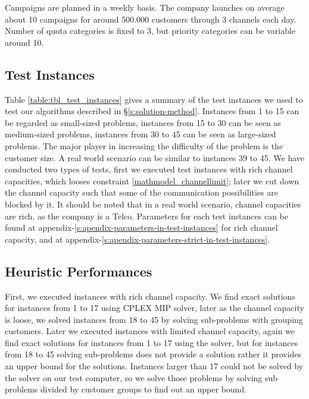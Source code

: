 \documentclass[11pt]{article}
\begin{document}
Campaigns are planned in a weekly basis. The company launches on average about 10 campaigns for around 500.000 customers through 3 channels each day. Number of quota categories is fixed to 3, but priority categories can be variable around 10.

\subsection{Test Instances} \label{test_cases}
Table \ref{table:tbl_test_instances} gives a summary of the test instances we used to test our algorithms described in \S \ref{s:solution-method}. Instances from 1 to 15 can be regarded as small-sized problems, instances from 15 to 30 can be seen as medium-sized problems, instances from 30 to 45 can be seen as large-sized problems. The major player in increasing the difficulty of the problem is the customer size. A real world scenario can be similar to instances 39 to 45. We have conducted two types of tests, first we executed test instances with rich channel capacities, which looses constraint \eqref{mathmodel_channellimit}; later we cut down the channel capacity such that some of the communication possibilities are blocked by it. It should be noted that in a real world scenario, channel capacities are rich, as the company is a Telco. Parameters for each test instances can be found at appendix-\ref{s:apendix-parameters-in-test-instances} for rich channel capacity, and at appendix-\ref{s:apendix-parameters-strict-in-test-instances}.\\

\begin{table}[htb!]
\end{table}
\clearpage

\subsection{Heuristic Performances} \label{s:test_evaluation}
First, we executed instances with rich channel capacity. We find exact solutions for instances from 1 to 17 using CPLEX MIP solver, later as the channel capacity is loose, we solved instances from 18 to 45 by solving sub-problems with grouping customers. Later we executed instances with limited channel capacity, again we find exact solutions for instances from 1 to 17 using the solver, but for instances from 18 to 45 solving sub-problems does not provide a solution rather it provides an upper bound for the solutions. Instances larger than 17 could not be solved by the solver on our test computer, so we solve those problems by solving sub problems divided by customer groups to find out an upper bound.
\end{document}

